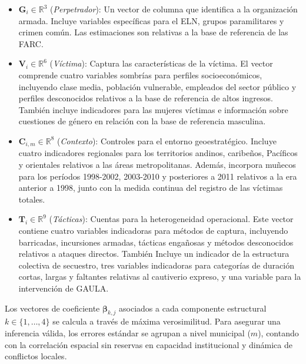 \documentclass[12pt]{article}
\theoremstyle{definition}
\theoremstyle{remark}
\newcommand{\1}{\mathbf{1}}
\begin{document}
\begin{itemize}
    \item $\mathbf{G}_i \in \mathbb{R}^3$ (\textit{Perpetrador}): Un vector de columna que identifica a la organización armada. Incluye variables específicas para el ELN, grupos paramilitares y crimen común. Las estimaciones son relativas a la base de referencia de las FARC.
    
    \item $\mathbf{V}_i \in \mathbb{R}^6$ (\textit{Víctima}): Captura las características de la víctima. El vector comprende cuatro variables sombrías para perfiles socioeconómicos, incluyendo clase media, población vulnerable, empleados del sector público y perfiles desconocidos relativos a la base de referencia de altos ingresos. También incluye indicadores para las mujeres víctimas e información sobre cuestiones de género en relación con la base de referencia masculina.
    
    \item $\mathbf{C}_{i,m} \in \mathbb{R}^8$ (\textit{Contexto}): Controles para el entorno geoestratégico. Incluye cuatro indicadores regionales para los territorios andinos, caribeños, Pacíficos y orientales relativos a las áreas metropolitanas. Además, incorpora muñecos para los períodos 1998-2002, 2003-2010 y posteriores a 2011 relativos a la era anterior a 1998, junto con la medida continua del registro de las víctimas totales.
    
    \item $\mathbf{T}_i \in \mathbb{R}^9$ (\textit{Tácticas}): Cuentas para la heterogeneidad operacional. Este vector contiene cuatro variables indicadoras para métodos de captura, incluyendo barricadas, incursiones armadas, tácticas engañosas y métodos desconocidos relativos a ataques directos. También Incluye un indicador de la estructura colectiva de secuestro, tres variables indicadoras para categorías de duración cortas, largas y faltantes relativas al cautiverio expreso, y una variable para la intervención de GAULA.
\end{itemize}

Los vectores de coeficiente $\boldsymbol{\beta}_{k,j}$ asociados a cada componente estructural $k \in \{1, \dots, 4\}$ se calcula a través de máxima verosimilitud. Para asegurar una inferencia válida, los errores estándar se agrupan a nivel municipal ($m$), contando con la correlación espacial sin reservas en capacidad institucional y dinámica de conflictos locales.
\end{document}
